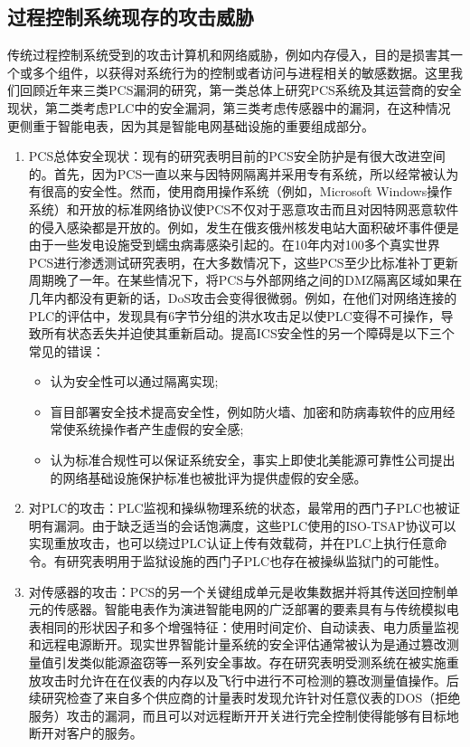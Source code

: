 \subsection{过程控制系统现存的攻击威胁}

传统过程控制系统受到的攻击计算机和网络威胁，例如内存侵入，目的是损害其一个或多个组件，以获得对系统行为的控制或者访问与进程相关的敏感数据。这里我们回顾近年来三类PCS漏洞的研究，第一类总体上研究PCS系统及其运营商的安全现状，第二类考虑PLC中的安全漏洞，第三类考虑传感器中的漏洞，在这种情况更侧重于智能电表，因为其是智能电网基础设施的重要组成部分。

\begin{enumerate}
\item PCS总体安全现状：现有的研究\parencite{Byres03}表明目前的PCS安全防护是有很大改进空间的。首先，因为PCS一直以来与因特网隔离并采用专有系统，所以经常被认为有很高的安全性。然而，使用商用操作系统（例如，Microsoft Windows操作系统）和开放的标准网络协议使PCS不仅对于恶意攻击而且对因特网恶意软件的侵入感染都是开放的。例如，发生在俄亥俄州核发电站大面积破坏事件便是由于一些发电设施受到蠕虫病毒感染引起的。在10年内对100多个真实世界PCS进行渗透测试研究表明，在大多数情况下，这些PCS至少比标准补丁更新周期晚了一年。在某些情况下，将PCS与外部网络之间的DMZ隔离区域如果在几年内都没有更新的话，DoS攻击会变得很微弱。例如，在他们对网络连接的PLC的评估中，发现具有6字节分组的洪水攻击足以使PLC变得不可操作，导致所有状态丢失并迫使其重新启动。提高ICS安全性的另一个障碍是以下三个常见的错误\parencite{Pietre11}：
\begin{itemize}
\item 认为安全性可以通过隔离实现;
\item 盲目部署安全技术提高安全性，例如防火墙、加密和防病毒软件的应用经常使系统操作者产生虚假的安全感;
\item 认为标准合规性可以保证系统安全，事实上即使北美能源可靠性公司提出的网络基础设施保护标准也被批评为提供虚假的安全感\parencite{Weiss09}。
\end{itemize}
\item 对PLC的攻击：PLC监视和操纵物理系统的状态，最常用的西门子PLC也被证明有漏洞。由于缺乏适当的会话饱满度，这些PLC使用的ISO-TSAP协议可以实现重放攻击\parencite{Beresford11}，也可以绕过PLC认证上传有效载荷，并在PLC上执行任意命令。有研究表明用于监狱设施的西门子PLC也存在被操纵监狱门的可能性\parencite{Newman11}。
\item 对传感器的攻击：PCS的另一个关键组成单元是收集数据并将其传送回控制单元的传感器。智能电表作为演进智能电网的广泛部署的要素具有与传统模拟电表相同的形状因子\parencite{Blumsack12}和多个增强特征：使用时间定价\parencite{King01}、自动读表、电力质量监视和远程电源断开。现实世界智能计量系统的安全评估通常被认为是通过篡改测量值引发类似能源盗窃等一系列安全事故\parencite{McLaughlin092}。存在研究表明受测系统在被实施重放攻击时允许在在仪表的内存以及飞行中进行不可检测的篡改测量值操作。后续研究检查了来自多个供应商的计量表时发现允许针对任意仪表的DOS（拒绝服务）攻击的漏洞，而且可以对远程断开开关进行完全控制使得能够有目标地断开对客户的服务\parencite{McLaughlin102}。
\end{enumerate}

